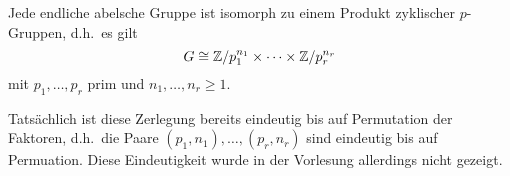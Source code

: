 \begin{corollary}
  Jede endliche abelsche Gruppe ist isomorph zu einem Produkt zyklischer $p$-Gruppen, d.h.\ es gilt
  \[
          G
    \cong \mathbb{Z}/p_1^{n_1} \times \dotsm \times \mathbb{Z}/p_r^{n_r}
  \]
  mit $p_1, \dotsc, p_r$ prim und $n_1, \dotsc, n_r \geq 1$.
\end{corollary}

\begin{remark}
  Tatsächlich ist diese Zerlegung bereits eindeutig bis auf Permutation der Faktoren, d.h.\ die Paare $(p_1, n_1), \dotsc, (p_r, n_r)$ sind eindeutig bis auf Permuation.
  Diese Eindeutigkeit wurde in der Vorlesung allerdings nicht gezeigt.
\end{remark}




